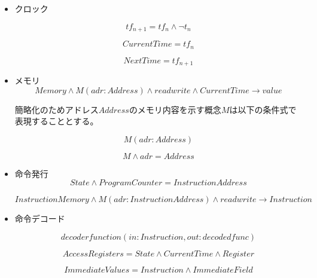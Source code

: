 \documentclass[12pt]{article}
\begin{document}
\begin{itemize}
\item
  クロック

  \begin{equation}tf_{n+1} = tf_{n} \wedge \neg t_{n}\end{equation}

  \begin{equation} CurrentTime=tf_{n}\end{equation}

  \begin{equation} NextTime=tf_{n+1} \end{equation}
\item
  メモリ
  \begin{equation} Memory \wedge M(adr:Address) \wedge readwrite \wedge CurrentTime \rightarrow value \end{equation}

  簡略化のためアドレス\(Address\)のメモリ内容を示す概念\(M\)は以下の条件式で表現することとする。

  \begin{equation}M(adr:Address)\end{equation}

  \begin{equation} M \wedge adr = Address \end{equation}
\item
  命令発行\\
  \begin{equation} State \wedge ProgramCounter = InstructionAddress \end{equation}

  \begin{equation} InstructionMemory \wedge M(adr:InstructionAddress) \wedge readwrite \rightarrow Instruction\end{equation}
\item
  命令デコード

  \begin{equation} decoderfunction(in:Instruction,out:decodedfunc)\end{equation}

  \begin{equation} AccessRegisters = State \wedge CurrentTime \wedge Register \end{equation}

  \begin{equation} ImmediateValues=Instruction \wedge ImmediateField\end{equation}


\end{itemize}
\end{document}
